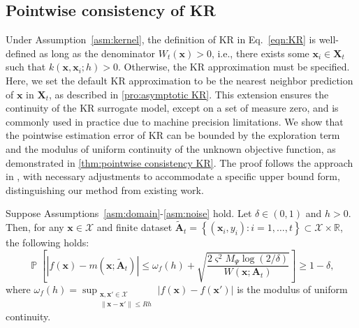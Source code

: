 \documentclass[11pt,en]{elegantpaper}
\newcommand{\domain}{\mathcal{X}}
\newcommand{\X}{\bm{X}}
\newcommand{\x}{\bm{x}}
\newcommand{\A}{\bm{A}}
\newcommand{\1}{\mathds{1}}
\newcommand{\set}[1]{\left\{#1\right\}}
\DeclareMathOperator*{\Prob}{\mathbb{P}}
\begin{document}
\subsection{Pointwise consistency of KR}
\label{sec:pointwise consistency of KR}

Under Assumption~\ref{asm:kernel}, the definition of KR in Eq.~\eqref{eqn:KR} is well-defined as long as the denominator $W_t(\x) > 0$, i.e., there exists some $\x_i \in \X_t$ such that $k(\x, \x_i; h) > 0$. Otherwise, the KR approximation must be specified.
Here, we set the default KR approximation to be the nearest neighbor prediction of $\x$ in $\X_t$, as described in \cref{pro:asymptotic KR}. This extension ensures the continuity of the KR surrogate model, except on a set of measure zero, and is commonly used in practice due to machine precision limitations. We show that the pointwise estimation error of KR can be bounded by the exploration term and the modulus of uniform continuity of the unknown objective function, as demonstrated in \cref{thm:pointwise consistency KR}. The proof follows the approach in \cite{linke2023towards}, with necessary adjustments to accommodate a specific upper bound form, distinguishing our method from existing work.


\begin{theorem}
    \label{thm:pointwise consistency KR}
    Suppose Assumptions~\ref{asm:domain}-\ref{asm:noise} hold. Let $\delta \in (0, 1)$ and $h > 0$. Then, for any $\x \in \domain$ and finite dataset $\tilde{\A}_t = \set{(\x_i, y_i) : i = 1, \dots, t} \subset \domain \times \mathbb{R}$, the following holds:
    \begin{equation}
        \Prob \left[ \left|f(\x) - m(\x; \tilde{\A}_t) \right| \le \omega_f(h) + \sqrt{\dfrac{2 \varsigma^2 M_{\Psi} \log(2/\delta)}{W(\x; \A_t)}} \right] \ge 1 - \delta,
    \end{equation}
    where $\displaystyle \omega_f(h) = \sup_{\substack{\x, \x' \in \domain \\ \| \x - \x' \| \le Rh}} |f(\x) - f(\x')|$ is the modulus of uniform continuity.
\end{theorem}
\end{document}
